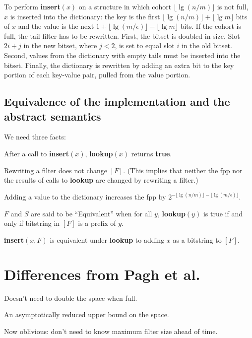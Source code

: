 \documentclass[11pt,letterpaper]{article}
\begin{document}
To perform {\bf insert$(x)$} on a structure in which cohort $\lfloor \lg (n/m) \rfloor$ is not full, $x$ is inserted into the dictionary: the key is the first $\lfloor \lg (n/m) \rfloor + \lfloor \lg m \rfloor$ bits of $x$ and the value is the next $1 + \lfloor \lg (m/\epsilon) \rfloor - \lfloor \lg m \rfloor$ bits.
If the cohort is full, the tail filter has to be rewritten.
First, the bitset is doubled in size.
Slot $2i + j$ in the new bitset, where $j < 2$, is set to equal slot $i$ in the old bitset.
Second, values from the dictionary with empty tails must be inserted into the bitset.
Finally, the dictionary is rewritten by adding an extra bit to the key portion of each key-value pair, pulled from the value portion.

\subsection{Equivalence of the implementation and the abstract semantics}

We need three facts:

After a call to {\bf insert$(x)$}, {\bf lookup$(x)$} returns {\bf true}.


Rewriting a filter does not change $[F]$. (This implies that neither the fpp nor the results of calls to {\bf lookup} are changed by rewriting a filter.)

Adding a value to the dictionary increases the fpp by $2^{-\lfloor \lg (n/m) \rfloor - \lfloor \lg (m/\epsilon) \rfloor}$.

$F$ and $S$ are said to be ``Equivalent'' when for all $y$, {\bf lookup$(y)$} is true if and only if bitstring in $[F]$ is a prefix of $y$.

{\bf insert$(x, F)$} is equivalent under {\bf lookup} to adding $x$ as a bitstring to $[F]$.

\section{Differences from Pagh et al.}

Doesn't need to double the space when full.

An asymptotically reduced upper bound on the space.

Now oblivious: don't need to know maximum filter size ahead of time.

{}

\end{document}
